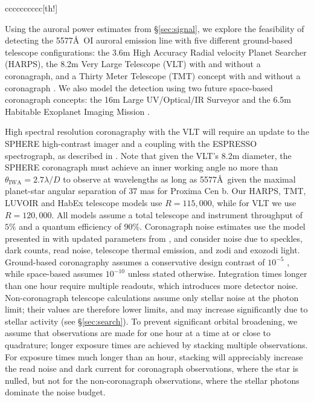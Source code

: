 \documentclass{emulateapj}
\newcommand{\XXX}[1]{#1}      %
\begin{document}
\begin{deluxetable*}{cccccccccc}[th!]
\end{deluxetable*}

Using the auroral power estimates from \S\ref{sec:signal}, we explore the feasibility of detecting the 5577\AA\ OI auroral emission line with five different ground-based telescope configurations: the 3.6m High Accuracy Radial velocity Planet Searcher (HARPS), the 8.2m Very Large Telescope (VLT) with and without a coronagraph, and a Thirty Meter Telescope (TMT) concept with and without a coronagraph \citep{Skidmore2015,Udry2014,Johns2012}. We also model the detection using two future space-based coronagraph concepts: the 16m Large UV/Optical/IR Surveyor \citep[LUVOIR;][]{Kouveliotou2014,Dalcanton2015} and the 6.5m Habitable Exoplanet Imaging Mission \citep[HabEx;][]{Mennesson2016}.

High spectral resolution coronagraphy with the VLT will require an update to the SPHERE high-contrast imager and a coupling with the ESPRESSO spectrograph, as described in \citet{Lovis2016}. Note that given the VLT's 8.2m diameter, the SPHERE coronagraph must achieve an inner working angle no more than $\theta_{\text{IWA}} = 2.7 \lambda / D$ to \XXX{observe at wavelengths} as long as 5577\AA\, given the maximal planet-star angular separation of 37 mas for Proxima Cen b. Our HARPS, TMT, LUVOIR and HabEx telescope models use $R = 115,000$, while for VLT we use $R = 120,000$. All models assume a total \XXX{telescope and instrument} throughput of $5\%$ and a quantum efficiency of 90\%. Coronagraph noise estimates use the model presented in \citet{Robinson2016} with updated parameters from \citet{Meadows2016}, and consider noise due to speckles, dark counts, read noise, telescope thermal emission, and zodi and exozodi light. Ground-based coronagraphy assumes a conservative design contrast of $10^{-5}$ \citep{Dou2010,Guyon2012}, while space-based assumes $10^{-10}$ \citep{Meadows2016} unless stated otherwise. Integration times longer than one hour require multiple readouts, which introduces more detector noise. Non-coronagraph telescope calculations assume only stellar noise at the photon limit; their values are therefore lower limits, and may increase significantly due to stellar activity (see \S\ref{sec:search}). To prevent significant orbital broadening, we assume that observations are made for one hour at a time at or close to quadrature; longer exposure times are achieved by stacking multiple observations. For exposure times much longer than an hour, stacking will appreciably increase the read noise and dark current for coronagraph observations, where the star is nulled, but not for the non-coronagraph observations, where the stellar photons dominate the noise budget.
\end{document}
